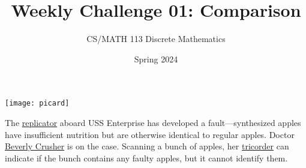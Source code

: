 \documentclass[a4paper]{exam}
\title{Weekly Challenge 01: Comparison}
\author{CS/MATH 113 Discrete Mathematics}
\date{Spring 2024}
\begin{document}
\maketitle

\begin{questions}
  
  \begin{minipage}{.3\linewidth}
  \centerline{\texttt{[image: picard]}}
\end{minipage}
\begin{minipage}{.65\linewidth}
  The \href{https://en.wikipedia.org/wiki/Replicator_(Star_Trek)}{replicator} aboard USS Enterprise has developed a fault---synthesized apples have insufficient nutrition but are otherwise identical to regular apples. Doctor \href{https://memory-alpha.fandom.com/wiki/Beverly_Crusher}{Beverly Crusher} is on the case. Scanning a bunch of apples, her \href{https://en.wikipedia.org/wiki/Medical_tricorder}{tricorder} can indicate if the bunch contains any faulty apples, but it cannot identify them.
\end{minipage}


\end{questions}
\end{document}
